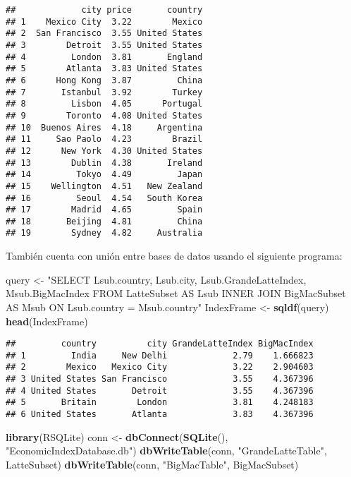 \documentclass[]{article}
\newenvironment{Shaded}{\begin{snugshade}}{\end{snugshade}}
\newcommand{\KeywordTok}[1]{\textcolor[rgb]{0.13,0.29,0.53}{\textbf{#1}}}
\newcommand{\NormalTok}[1]{#1}
\newcommand{\StringTok}[1]{\textcolor[rgb]{0.31,0.60,0.02}{#1}}
\begin{document}
\begin{verbatim}
##             city price       country
## 1    Mexico City  3.22        Mexico
## 2  San Francisco  3.55 United States
## 3        Detroit  3.55 United States
## 4         London  3.81       England
## 5        Atlanta  3.83 United States
## 6      Hong Kong  3.87         China
## 7       Istanbul  3.92        Turkey
## 8         Lisbon  4.05      Portugal
## 9        Toronto  4.08 United States
## 10  Buenos Aires  4.18     Argentina
## 11     Sao Paolo  4.23        Brazil
## 12      New York  4.30 United States
## 13        Dublin  4.38       Ireland
## 14         Tokyo  4.49         Japan
## 15    Wellington  4.51   New Zealand
## 16         Seoul  4.54   South Korea
## 17        Madrid  4.65         Spain
## 18       Beijing  4.81         China
## 19        Sydney  4.82     Australia
\end{verbatim}

También cuenta con unión entre bases de datos usando el siguiente
programa:

\begin{Shaded}
\begin{Highlighting}[]
\NormalTok{query <-}\StringTok{ "SELECT Lsub.country, Lsub.city, Lsub.GrandeLatteIndex, Msub.BigMacIndex}
\StringTok{FROM LatteSubset AS Lsub INNER JOIN BigMacSubset AS Msub}
\StringTok{ON Lsub.country = Msub.country"}
\NormalTok{IndexFrame <-}\StringTok{ }\KeywordTok{sqldf}\NormalTok{(query)}
\KeywordTok{head}\NormalTok{(IndexFrame)}
\end{Highlighting}
\end{Shaded}

\begin{verbatim}
##         country          city GrandeLatteIndex BigMacIndex
## 1         India     New Delhi             2.79    1.666823
## 2        Mexico   Mexico City             3.22    2.904603
## 3 United States San Francisco             3.55    4.367396
## 4 United States       Detroit             3.55    4.367396
## 5       Britain        London             3.81    4.248183
## 6 United States       Atlanta             3.83    4.367396
\end{verbatim}

\begin{Shaded}
\begin{Highlighting}[]
\KeywordTok{library}\NormalTok{(RSQLite)}
\NormalTok{conn <-}\StringTok{ }\KeywordTok{dbConnect}\NormalTok{(}\KeywordTok{SQLite}\NormalTok{(), }\StringTok{"EconomicIndexDatabase.db"}\NormalTok{)}
\KeywordTok{dbWriteTable}\NormalTok{(conn, }\StringTok{"GrandeLatteTable"}\NormalTok{, LatteSubset)}
\KeywordTok{dbWriteTable}\NormalTok{(conn, }\StringTok{"BigMacTable"}\NormalTok{, BigMacSubset)}
\end{Highlighting}
\end{Shaded}
\end{document}
